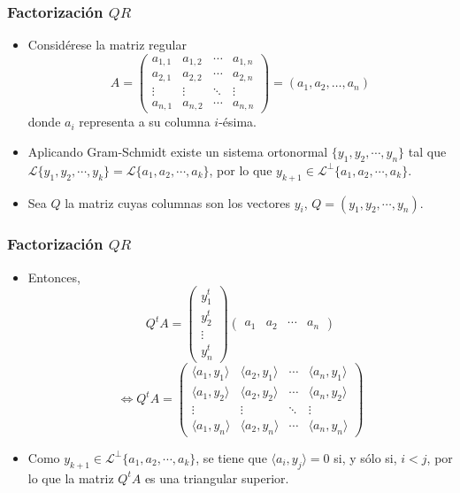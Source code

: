 \documentclass{beamer}
\begin{document}
\begin{frame}
  \frametitle{Factorizaci\'on $QR$}
  \begin{itemize}
    \item<1-> Consid\'erese la matriz regular
    $$
    A=\left(\begin{array}{cccc}
             a_{1,1} & a_{1,2} & \cdots & a_{1,n} \\
             a_{2,1} & a_{2,2} & \cdots & a_{2,n} \\
             \vdots & \vdots & \ddots & \vdots \\
             a_{n,1} & a_{n,2} & \cdots & a_{n,n}
             \end{array}\right) = \left(a_1,a_2,\ldots,a_n\right)
    $$    
    donde $a_i$ representa a su columna $i$-\'esima.
    \item<2-> Aplicando Gram-Schmidt existe un sistema ortonormal $\{y_1, y_2, \cdots, y_n\}$ tal que $\mathcal{L}\{y_1, y_2,\cdots, y_k\} =
    \mathcal{L}\{a_1, a_2, \cdots, a_k\}$, por lo que $y_{k+1} \in \mathcal{L}^{\perp} \{a_1 , a_2 ,\cdots, a_k \}$.
    \item<3-> Sea $Q$ la matriz cuyas columnas son los vectores $y_i$, $Q=(y_1,y_2,\cdots,y_n)$.    
  \end{itemize}
\end{frame}   
\begin{frame}
  \frametitle{Factorizaci\'on $QR$}
  \begin{itemize}
    \item<1-> Entonces,
    $$
    Q^tA = \left(\begin{array}{c}
                  y_1^t\\
                  y_2^t\\
                  \vdots\\
                  y_n^t
                 \end{array}\right)
            \left(\begin{array}{cccc}
             a_{1} & a_{2} & \cdots & a_{n}
             \end{array}\right) 
    $$
    $$
    \iff Q^tA = \left(\begin{array}{cccc}
      \langle a_1,y_1\rangle & \langle a_2,y_1\rangle & \cdots & \langle a_n,y_1\rangle\\
      \langle a_1,y_2\rangle & \langle a_2,y_2\rangle & \cdots & \langle a_n,y_2\rangle\\
\vdots & \vdots & \ddots & \vdots\\
      \langle a_1,y_n\rangle & \langle a_2,y_n\rangle &\cdots & \langle a_n,y_n\rangle
      \end{array}\right)
    $$
    \item<2-> Como $y_{k+1} \in \mathcal{L}^{\perp} \{a_1 , a_2 , \cdots, a_k\}$, se tiene que $\langle a_i , y_j\rangle=0$ si, y
    s\'olo si, $i < j$, por lo que la matriz $Q^tA$ es una triangular superior.
  \end{itemize}
\end{frame}
\end{document}
